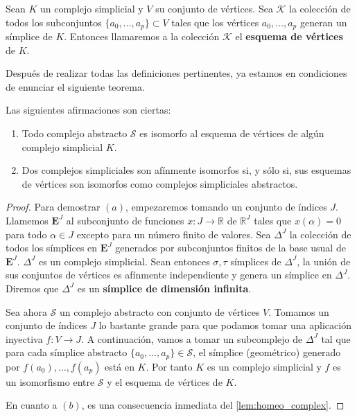 \begin{definicion}
	Sean $K$ un complejo simplicial y $V$ su conjunto de vértices. Sea $\mathcal{K}$ la colección de 
	todos los subconjuntos $\{a_0, \dots, a_p\} \subset V$ tales que los vértices $a_0, \dots, a_p$ 
	generan un símplice de $K$. Entonces llamaremos a la colección $\mathcal{K}$ el 
	\textbf{esquema de vértices} de $K$.
\end{definicion}

Después de realizar todas las definiciones pertinentes, ya estamos en condiciones de enunciar el 
siguiente teorema.

\begin{teorema}
	Las siguientes afirmaciones son ciertas:
	\begin{enumerate}[label=(\alph*)]
		\item Todo complejo abstracto $\mathcal{S}$ es isomorfo al esquema de vértices de algún 
		complejo simplicial $K$.
		\item Dos complejos simpliciales son afínmente isomorfos si, y sólo si, sus esquemas 
		de vértices son isomorfos como complejos simpliciales abstractos.
	\end{enumerate}
\end{teorema}
\begin{proof}
	Para demostrar $(a)$, empezaremos tomando un conjunto de índices $J$. Llamemos $\mathbf{E}^J$ 
	al subconjunto de funciones $x: J \rightarrow \mathbb{R}$ de $\mathbb{R}^J$ tales que $x(\alpha) = 0$ 
	para todo $\alpha \in J$ excepto para un número finito de valores. Sea $\Delta^J$ la 
	colección de todos los símplices en $\mathbf{E}^J$ generados por subconjuntos finitos de 
	la base usual de $\mathbf{E}^J$. $\Delta^J$ es un complejo simplicial. 
	Sean entonces $\sigma, \tau$ símplices de $\Delta^J$, la 
	unión de sus conjuntos de vértices es afínmente independiente y genera un símplice en $\Delta^J$.
	Diremos que $\Delta^J$ es un \textbf{símplice de dimensión infinita}.
	
	Sea ahora $\mathcal{S}$ un complejo abstracto con conjunto de vértices $V$. Tomamos un conjunto 
	de índices $J$ lo bastante grande para que podamos tomar una aplicación inyectiva 
	$f: V \rightarrow J$. A continuación, vamos a tomar un subcomplejo de $\Delta^J$ tal que para 
	cada símplice abstracto $\{a_0, \dots, a_p\} \in \mathcal{S}$, el símplice (geométrico) generado 
	por $f(a_0), \dots, f(a_p)$ está en $K$. Por tanto $K$ es un complejo simplicial y 
	$f$ es un isomorfismo entre $\mathcal{S}$ y el esquema de vértices de $K$.
	
	En cuanto a $(b)$, es una consecuencia inmediata del \autoref{lem:homeo_complex}.
\end{proof}

